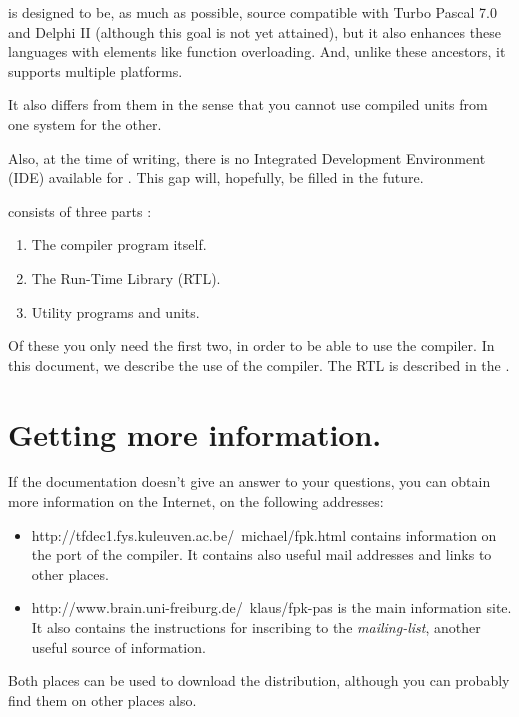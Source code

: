 \documentclass{report}
\begin{document}
\fpk is designed to be, as much as possible, source compatible with 
Turbo Pascal 7.0 and Delphi II (although this goal is not yet attained), 
but it also enhances these languages with elements like function overloading.
And, unlike these ancestors, it supports multiple platforms.

It also differs from them in the sense that you cannot use compiled units
from one system for the other.

Also, at the time of writing, there is no Integrated Development Environment
(IDE) available for \fpk. This gap will, hopefully, be filled in the future.

\fpk consists of three parts :
\begin{enumerate}
\item The compiler program itself.
\item The Run-Time Library (RTL).
\item Utility programs and units.
\end{enumerate}

Of these you only need the first two, in order to be able to use the compiler.
In this document, we describe the use of the compiler. The RTL is described in the
.

\section{Getting more information.}
If the documentation doesn't give an answer to your questions, 
you can obtain more information on the Internet, on the following addresses:
\begin{itemize}
\item {}
{http://tfdec1.fys.kuleuven.ac.be/~michael/fpk.html} contains information 
on the \linux port of the compiler. It contains also useful mail addresses and
links to other places.
\item {}
{http://www.brain.uni-freiburg.de/~klaus/fpk-pas} is the main \fpk information site. 
It also contains the instructions for inscribing to the \textit{mailing-list}, 
another useful source of information.
\end{itemize}
Both places can be used to download the \fpk distribution, although you can 
probably find them on other places also.
\end{document}
